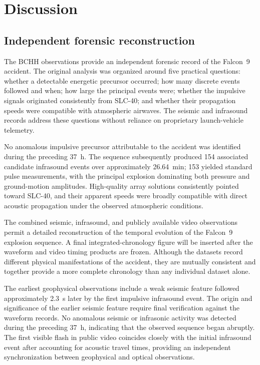 \documentclass[]{seismica}
\begin{document}
\section{Discussion}
\label{sec:discussion}

\subsection{Independent forensic reconstruction}
\label{sec:discussion_reconstruction}

The BCHH observations provide an independent forensic record of the Falcon~9
accident. The original analysis was organized around five practical questions:
whether a detectable energetic precursor occurred; how many discrete events
followed and when; how large the principal events were; whether the impulsive
signals originated consistently from SLC-40; and whether their propagation
speeds were compatible with atmospheric airwaves. The seismic and infrasound
records address these questions without reliance on proprietary launch-vehicle
telemetry.

No anomalous impulsive precursor attributable to the accident was identified
during the preceding 37~h. The sequence subsequently produced 154 associated candidate infrasound
 events over approximately 26.64~min; 153 yielded standard pulse measurements,
 with the principal
explosion dominating both pressure and ground-motion amplitudes. High-quality
array solutions consistently pointed toward SLC-40, and their apparent speeds
were broadly compatible with direct acoustic propagation under the observed
atmospheric conditions.

The combined seismic, infrasound, and publicly available video observations
permit a detailed reconstruction of the temporal evolution of the Falcon~9
explosion sequence. A final integrated-chronology figure will be inserted after the waveform and video timing products are frozen. Although the datasets record
different physical manifestations of the accident, they are mutually
consistent and together provide a more complete chronology than any individual
dataset alone.

The earliest geophysical observations include a weak seismic feature followed approximately 2.3~s later by the first impulsive infrasound event. The origin and significance of the earlier seismic feature require final verification against the waveform records. No anomalous seismic or infrasonic activity was detected during the preceding 37~h, indicating that the observed sequence began abruptly. The first visible flash in public video coincides closely with the initial infrasound event after accounting for acoustic travel times, providing an independent synchronization between geophysical and optical observations.
\end{document}
